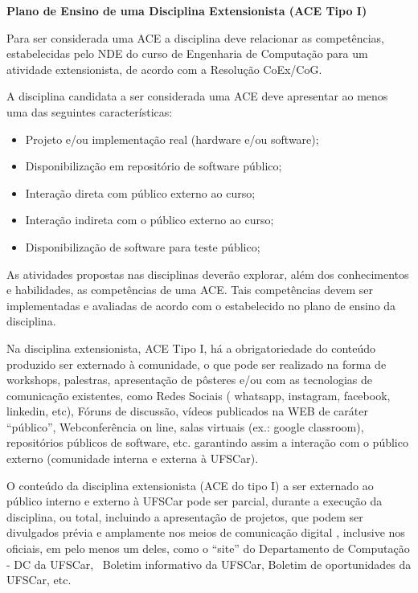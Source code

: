 \bigskip

\textbf{Plano de Ensino de uma Disciplina Extensionista (ACE Tipo I)}


\bigskip

Para ser considerada uma ACE a disciplina deve relacionar as competências, estabelecidas pelo NDE do curso de Engenharia
de Computação para um atividade extensionista, de acordo com a Resolução CoEx/CoG. 

A disciplina candidata a ser considerada uma ACE deve apresentar ao menos uma das seguintes características: 

\begin{itemize}[series=listWWNumi,label=\textstyleListLabeli{${\bullet}$}]
\item Projeto e/ou implementação real (hardware e/ou software);
\item Disponibilização em repositório de software público;
\item Interação direta com público externo ao curso;
\item Interação indireta com o público externo ao curso;
\item Disponibilização de software para teste público;
\end{itemize}

\bigskip

As atividades propostas nas disciplinas deverão explorar, além dos conhecimentos e habilidades, as competências de uma
ACE. Tais competências devem ser implementadas e avaliadas de acordo com o estabelecido no plano de ensino da
disciplina.


\bigskip

Na disciplina extensionista, ACE Tipo I, há a obrigatoriedade do conteúdo produzido ser externado à comunidade, o que
pode ser realizado na forma de workshops, palestras, apresentação de pôsteres e/ou com as tecnologias de comunicação
existentes, como Redes Sociais (%
whatsapp, instagram, facebook, linkedin, etc), Fóruns de discussão, vídeos publicados na WEB de caráter “público”,
Webconferência on line, salas virtuais (ex.: google classroom), repositórios públicos de software, etc. garantindo
assim a interação com o público externo (comunidade interna e externa à UFSCar).


\bigskip

O conteúdo da disciplina extensionista (ACE do tipo I) a ser externado ao público interno e externo à UFSCar pode ser
parcial, durante a execução da disciplina, ou total, incluindo a apresentação de projetos, que podem ser divulgados
prévia e amplamente nos meios de comunicação digital%
, inclusive nos oficiais, em pelo menos um deles, como o “site” do Departamento de Computação - DC da UFSCar, \ Boletim
informativo da UFSCar, Boletim de oportunidades da UFSCar, etc.

%